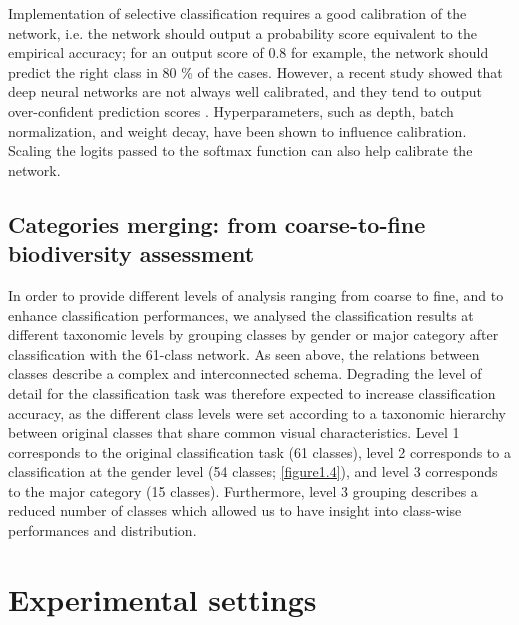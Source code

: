 Implementation of selective classification requires a good calibration of the network, i.e. the network should output a probability score equivalent to the empirical accuracy; for an output score of 0.8 for example, the network should predict the right class in 80 \% of the cases. However, a recent study showed that deep neural networks are not always well calibrated, and they tend to output over-confident prediction scores \citep{guo_calibration_2017}. Hyperparameters, such as depth, batch normalization, and weight decay, have been shown to influence calibration. Scaling the logits passed to the softmax function can also help calibrate the network.


\subsection{Categories merging: from coarse-to-fine biodiversity assessment}\label{chapitre1_4.5}
In order to provide different levels of analysis ranging from coarse to fine, and to enhance classification performances, we analysed the classification results at different taxonomic levels by grouping classes by gender or major category after classification with the 61-class network. As seen above, the relations between classes describe a complex and interconnected schema. Degrading the level of detail for the classification task was therefore expected to increase classification accuracy, as the different class levels were set according to a taxonomic hierarchy between original classes that share common visual characteristics. Level 1 corresponds to the original classification task (61 classes), level 2 corresponds to a classification at the gender level (54 classes; \autoref{figure1.4}), and level 3 corresponds to the major category (15 classes). Furthermore, level 3 grouping describes a reduced number of classes which allowed us to have insight into class-wise performances and distribution.

\section{Experimental settings}\label{chapitre1_5}

